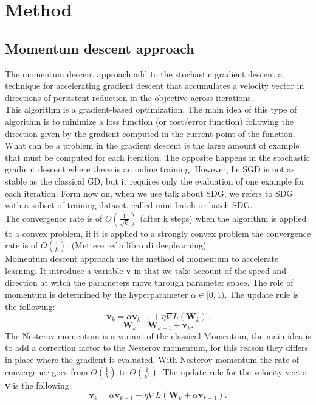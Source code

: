 \section{Method}

\subsection{Momentum descent approach}
The momentum descent approach add to the stochastic gradient descent a technique for accelerating gradient descent that accumulates a velocity vector in directions of persistent reduction in the objective across iterations. 
\\
This algorithm is a gradient-based optimization. The main idea of this type of algorithm is to minimize a loss function (or cost/error function) following the direction given by the gradient computed in the current point of the function.
\\
What can be a problem in the gradient descent is the large amount of example that must be computed for each iteration. The opposite happens in the stochastic gradient descent where there is an online training. However, he SGD is not as stable as the classical GD, but it requires only the evaluation of one example for each iteration. 
Form now on, when we use talk about SDG, we refers to SDG with a subset of training dataset, called mini-batch or batch SDG.
\\
The convergence rate is of $O(\frac{1}{\sqrt{k}})$ (after k steps) when the algorithm is applied to a convex problem, if it is applied to a strongly convex problem the convergence rate is of $O(\frac{1}{k})$. (Mettere ref a libro di deeplearning)
\\
Momentum descent approach use the method of momentum to accelerate learning. It introduce a variable \textbf{v} in that we take account of the speed and direction at witch the parameters move through parameter space. The role of momentum is determined by the hyperparameter $\alpha\in[0,1)$.
The update rule is the following:
\begin{equation}
\label{classical_momentum}
\textbf{v}_k = \alpha\textbf{v}_{k-1} + \eta\nabla\textit{L}(\textbf{W}_k).
\end{equation}
\begin{equation}
\label{update_momentum}
\textbf{W}_k = \textbf{W}_{k-1}  + \textbf{v}_k.
\end{equation}
The Nesterov momentum is a variant of the classical Momentum, the main idea is to add a correction factor to the Nesterov momentum,  for this reason they differs in place where the gradient is evaluated. With Nesterov momentum the rate of convergence goes from $O(\frac{1}{k})$ to $O(\frac{1}{k^2})$.
The update rule for the velocity vector \textbf{v} is the following:
\begin{equation}
\label{nesterov_momentum}
\textbf{v}_k = \alpha\textbf{v}_{k-1} + \eta\nabla\textit{L}(\textbf{W}_k + \alpha\textbf{v}_{k-1}).
\end{equation}
